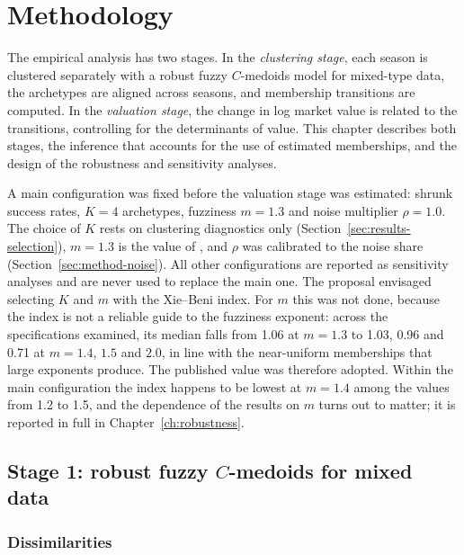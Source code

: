 \chapter{Methodology}
\label{ch:methodology}

The empirical analysis has two stages. In the \emph{clustering stage}, each season is clustered separately with a robust fuzzy $C$-medoids model for mixed-type data, the archetypes are aligned across seasons, and membership transitions are computed. In the \emph{valuation stage}, the change in log market value is related to the transitions, controlling for the determinants of value. This chapter describes both stages, the inference that accounts for the use of estimated memberships, and the design of the robustness and sensitivity analyses.

A main configuration was fixed before the valuation stage was estimated: shrunk success rates, $K=4$ archetypes, fuzziness $m=1.3$ and noise multiplier $\rho=1.0$. The choice of $K$ rests on clustering diagnostics only (Section~\ref{sec:results-selection}), $m=1.3$ is the value of , and $\rho$ was calibrated to the noise share (Section~\ref{sec:method-noise}). All other configurations are reported as sensitivity analyses and are never used to replace the main one. The proposal envisaged selecting $K$ and $m$ with the Xie--Beni index. For $m$ this was not done, because the index is not a reliable guide to the fuzziness exponent: across the specifications examined, its median falls from 1.06 at $m=1.3$ to 1.03, 0.96 and 0.71 at $m=1.4$, $1.5$ and $2.0$, in line with the near-uniform memberships that large exponents produce. The published value was therefore adopted. Within the main configuration the index happens to be lowest at $m=1.4$ among the values from 1.2 to 1.5, and the dependence of the results on $m$ turns out to matter; it is reported in full in Chapter~\ref{ch:robustness}.

\section{Stage 1: robust fuzzy $C$-medoids for mixed data}
\label{sec:method-model}

\subsection{Dissimilarities}

